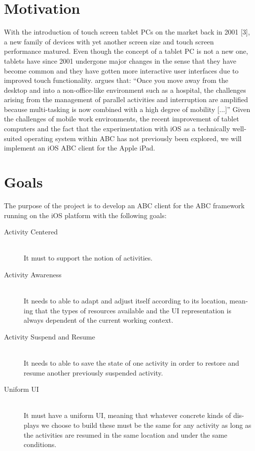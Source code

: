 \section{Motivation}
With the introduction of touch screen tablet PCs on the market back in 2001 [3], a new family of devices with yet another screen size and touch screen performance matured. Even though the concept of a tablet PC is not a new one, tablets have since 2001 undergone major changes in the sense that they have become common and they have gotten more interactive user interfaces due to improved touch functionality. \citet{bardram2011} argues that: “Once you move away from the desktop and into a non-office-like environment such as a hospital, the challenges arising from the management of parallel activities and interruption are amplified because multi-tasking is now combined with a high degree of mobility [...]”
Given the challenges of mobile work environments, the recent improvement of tablet computers and the fact that the experimentation with iOS as a technically well-suited operating system within ABC has not previously been explored, we will implement an iOS ABC client for the Apple iPad.

\section{Goals}
The purpose of the project is to develop an ABC client for the ABC framework running on the iOS platform with the following goals:

\begin{description}
  \item[Activity Centered] \hfill \\
  It must to support the notion of activities.
  \item[Activity Awareness] \hfill \\
  It needs to able to adapt and adjust itself according to its location, mean- ing that the types of resources available and the UI representation is always dependent of the current working context.
  \item[Activity Suspend and Resume] \hfill \\
  It needs to able to save the state of one activity in order to restore and resume another previously suspended activity.
  \item[Uniform UI] \hfill \\
  It must have a uniform UI, meaning that whatever concrete kinds of dis- plays we choose to build these must be the same for any activity as long as the activities are resumed in the same location and under the same conditions.
\end{description}

